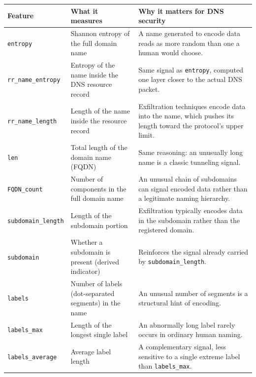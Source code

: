 \begin{table}[h]
\centering
\small
\begin{tabular}{@{}p{3cm}p{4.8cm}p{5.5cm}@{}}
\toprule
\textbf{Feature} & \textbf{What it measures} & \textbf{Why it matters for DNS security} \\
\midrule
\texttt{entropy} &
Shannon entropy of the full domain name &
A name generated to encode data reads as more random than one a human would
choose. \\

\texttt{rr\_name\_entropy} &
Entropy of the name inside the DNS resource record &
Same signal as \texttt{entropy}, computed one layer closer to the actual DNS
packet. \\

\texttt{rr\_name\_length} &
Length of the name inside the resource record &
Exfiltration techniques encode data into the name, which pushes its length
toward the protocol's upper limit. \\

\texttt{len} &
Total length of the domain name (FQDN) &
Same reasoning: an unusually long name is a classic tunneling signal. \\

\texttt{FQDN\_count} &
Number of components in the full domain name &
An unusual chain of subdomains can signal encoded data rather than a
legitimate naming hierarchy. \\

\texttt{subdomain\_length} &
Length of the subdomain portion &
Exfiltration typically encodes data in the subdomain rather than the
registered domain. \\

\texttt{subdomain} &
Whether a subdomain is present (derived indicator) &
Reinforces the signal already carried by \texttt{subdomain\_length}. \\

\texttt{labels} &
Number of labels (dot-separated segments) in the name &
An unusual number of segments is a structural hint of encoding. \\

\texttt{labels\_max} &
Length of the longest single label &
An abnormally long label rarely occurs in ordinary human naming. \\

\texttt{labels\_average} &
Average label length &
A complementary signal, less sensitive to a single extreme label than
\texttt{labels\_max}. \\


\end{tabular}
\end{table}
